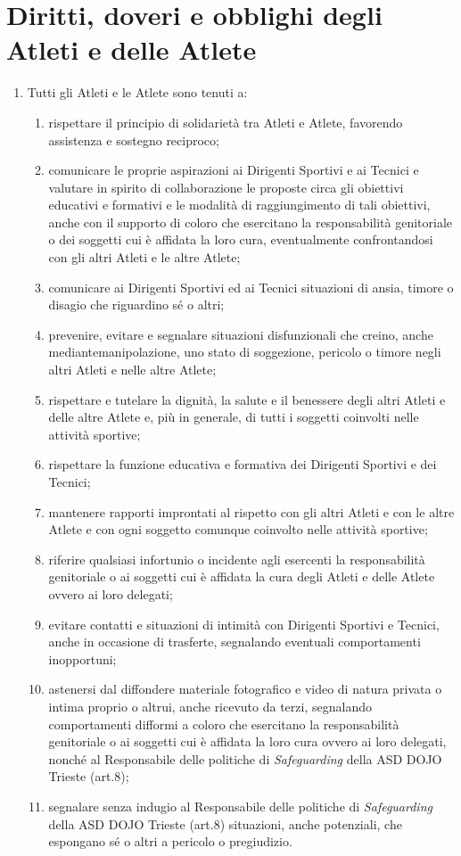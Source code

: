 \documentclass{djtsasddoc}
\begin{document}
	\section{Diritti, doveri e obblighi degli Atleti e delle Atlete}
	\begin{enumerate}
		\item Tutti gli Atleti e le Atlete sono tenuti a:
		\begin{enumerate}
			\item rispettare il principio di solidarietà tra Atleti e Atlete, favorendo assistenza e sostegno reciproco;
			\item comunicare le proprie aspirazioni ai Dirigenti Sportivi e ai Tecnici e valutare in spirito di	collaborazione le proposte circa gli obiettivi educativi e formativi e le modalità di 	raggiungimento di tali obiettivi, anche con il supporto di coloro che esercitano la responsabilità genitoriale o dei soggetti cui è affidata la loro cura, eventualmente confrontandosi con gli altri Atleti e le altre Atlete;
			\item comunicare ai Dirigenti Sportivi ed ai Tecnici situazioni di ansia, timore o disagio che 	riguardino sé o altri;
			\item prevenire, evitare e segnalare situazioni disfunzionali che creino, anche mediantemanipolazione, uno stato di soggezione, pericolo o timore negli altri Atleti e nelle altre Atlete;
			\item rispettare e tutelare la dignità, la salute e il benessere degli altri Atleti e delle altre Atlete e, più 	in generale, di tutti i soggetti coinvolti nelle attività sportive;
			\item rispettare la funzione educativa e formativa dei Dirigenti Sportivi e dei Tecnici;
			\item mantenere rapporti improntati al rispetto con gli altri Atleti e con le altre Atlete e con ogni	soggetto comunque coinvolto nelle attività sportive;
			\item riferire qualsiasi infortunio o incidente agli esercenti la responsabilità genitoriale o ai soggetti	cui è affidata la cura degli Atleti e delle Atlete ovvero ai loro delegati;
			\item evitare contatti e situazioni di intimità con Dirigenti Sportivi e Tecnici, anche in occasione di	trasferte, segnalando eventuali comportamenti inopportuni;
			\item astenersi dal diffondere materiale fotografico e video di natura privata o intima proprio o altrui, anche ricevuto da terzi, segnalando comportamenti difformi a coloro che esercitano la	responsabilità genitoriale o ai soggetti cui è affidata la loro cura ovvero ai loro delegati, nonché al Responsabile delle politiche di \textit{Safeguarding} della ASD DOJO Trieste (art.8);
			\item segnalare senza indugio al Responsabile delle politiche di \textit{Safeguarding} della ASD DOJO	Trieste (art.8) situazioni, anche potenziali, che espongano sé o altri a pericolo o pregiudizio.
		\end{enumerate}
	\end{enumerate}
	
\end{document}
